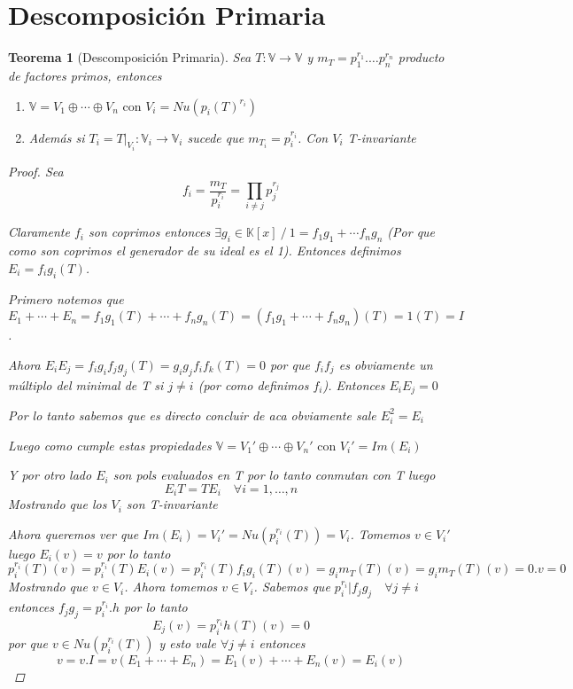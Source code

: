 \documentclass{article}
\theoremstyle{break}
\newtheorem{theorem}{Teorema}[section]
\begin{document}
\section{Descomposición Primaria}
\begin{theorem}[Descomposición Primaria]
  Sea $T: \mathbb{V} \rightarrow \mathbb{V}$ y $m_T=p_1^{r_1}.\ldots p_n^{r_n}$ producto de factores primos, entonces
  \begin{enumerate}
  \item $\mathbb{V} = V_1 \oplus \cdots \oplus V_n \text{ con } V_i = Nu(p_i(T)^{r_i})$
  \item Además si $T_i = T|_{V_i} : \mathbb{V}_i \rightarrow \mathbb{V}_i $ sucede que $m_{T_i} = p_i^{r_i}$. 
  Con $V_i$ T-invariante
  \end{enumerate}
  
  \begin{proof}
      Sea $$f_i = \frac{m_T }{p_i^{r_i}} = \prod_{i\neq j } p_j^{r_j}$$

      Claramente $f_i$ son coprimos entonces $\exists g_i \in \mathbb{K}[x]\ / \ 1 = f_1g_1 + \cdots f_ng_n$
      (Por que como son coprimos el generador de su ideal es el 1). Entonces definimos $E_i = f_ig_i(T)$.

      Primero notemos que $$E_1 + \cdots + E_n = f_1g_1(T) + \cdots + f_ng_n(T)= (f_1g_1 + \cdots + f_ng_n)(T) = 1(T) = I$$. 

      Ahora $E_iE_j = f_ig_if_jg_j(T) = g_ig_jf_if_k(T)= 0 $ por que $f_if_j$ es obviamente un múltiplo del minimal de T si $j\neq i $
      (por como definimos $f_i$). Entonces $E_iE_j = 0$

      
      Por lo tanto sabemos que es directo concluir de aca obviamente sale $E_i^2 = E_i$

      Luego como cumple estas propiedades $\mathbb{V }  = V_1' \oplus \cdots \oplus V_n' \text{ con } V_i' = Im(E_i)$

      Y por otro lado $E_i$ son pols evaluados en T por lo tanto conmutan con T luego 
      $$E_i T = TE_i \quad \forall i=1,\ldots,n$$ Mostrando que los $V_i$ son T-invariante
      
      Ahora queremos ver que $Im(E_i) = V_i' = Nu(p_i^{r_i}(T)) = V_i$. Tomemos $v \in V_i'$ luego $E_i(v) = v$ por lo tanto 
      $$ p_i^{r_i}(T)(v) = p_i^{r_i}(T)E_i(v) = p_i^{r_i}(T)f_ig_i(T)(v)= g_im_T(T)(v) = g_i m_T(T)(v) = 0.v = 0$$
      Mostrando que $v \in V_i$. Ahora tomemos $v \in V_i$. Sabemos que $p_i^{r_i} | f_jg_j \quad \forall j \neq i$ entonces 
      $f_jg_j = p_i^{r_i}.h$ por lo tanto $$E_j(v) = p_i^{r_i}h(T)(v) = 0  $$ 
      por que $v\in Nu(p_i^{r_i}(T))$ y esto vale $\forall j \neq i$ entonces 
      $$v = v.I = v(E_1 + \cdots + E_n) = E_1(v) + \cdots + E_n(v) = E_i(v)$$


\end{proof}
\end{theorem}
\end{document}

